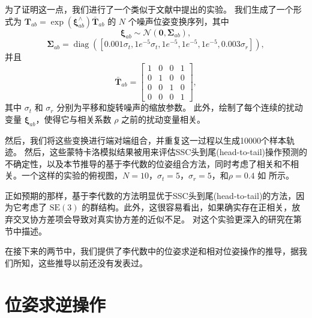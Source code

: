 为了证明这一点，我们进行了一个类似于文献\cite{barfoot2014associating}中提出的实验。 
我们生成了一个形式为 $\mathbf{T}_{ab} = \operatorname{exp}(\boldsymbol{\xi}_{ab}^{\wedge}) \bar{\mathbf{T}}_{ab}$ 的 $N$ 个噪声位姿变换序列，其中 
\begin{equation}
    \boldsymbol{\xi}_{ab} \sim \mathcal{N}(\mathbf{0}, \boldsymbol{\Sigma}_{ab}),
\end{equation}
\begin{equation}
    \boldsymbol{\Sigma}_{ab} = \operatorname{diag}([ 0.001\sigma_t, 1e^{-5}\sigma_t, 1e^{-5}, 1e^{-5}, 1e^{-5}, 0.003\sigma_r]),
\end{equation}
并且
\begin{equation}
    \bar{\mathbf{T}}_{ab} = \left[ \begin{array}{cccc}
        1 & 0 & 0 & 1 \\
        0 & 1 & 0 & 0 \\
        0 & 0 & 1 & 0 \\
        0 & 0 & 0 & 1
    \end{array} \right],
\end{equation}
其中 $\sigma_t$ 和 $\sigma_r$ 分别为平移和旋转噪声的缩放参数。 
此外，绘制了每个连续的扰动变量 $\boldsymbol{\xi}_{ab}$，使得它与相关系数 $\rho$ 之前的扰动变量相关。 

然后，我们将这些变换进行端对端组合，并重复这一过程以生成10000个样本轨迹。 
然后，这些蒙特卡洛模拟结果被用来评估SSC头到尾(head-to-tail)操作预测的不确定性，以及本节推导的基于李代数的位姿组合方法，同时考虑了相关和不相关。一个这样的实验的俯视图，$N=10$，$\sigma_t=5$，$\sigma_r=5$，和$\rho=0.4$ 如  所示。 

正如预期的那样，基于李代数的方法明显优于SSC头到尾(head-to-tail)的方法，因为它考虑了 $\mathrm{SE}(3)$ 的群结构。此外，这很容易看出，如果确实存在正相关，放弃交叉协方差项会导致对真实协方差的近似不足。 
对这个实验更深入的研究在第  节中描述。 

在接下来的两节中，我们提供了李代数中的位姿求逆和相对位姿操作的推导，据我们所知，这些推导以前还没有发表过。 


\section{位姿求逆操作}
\label{sec:inverse}

